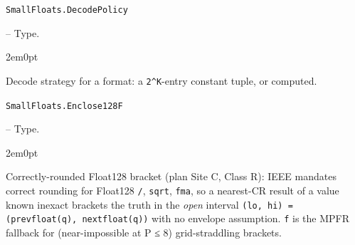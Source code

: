 \par\medskip\noindent\begin{minipage}{\linewidth}
\hypertarget{5477313120957585094}{\texttt{SmallFloats.DecodePolicy}}  -- {Type.}
\nopagebreak
\begin{adjustwidth}{2em}{0pt}

Decode strategy for a format: a \texttt{2{\textasciicircum}K}-entry constant tuple, or computed.



\end{adjustwidth}
\end{minipage}
\par\medskip

\par\medskip\noindent\begin{minipage}{\linewidth}
\hypertarget{1455587366773904952}{\texttt{SmallFloats.Enclose128F}}  -- {Type.}
\nopagebreak
\begin{adjustwidth}{2em}{0pt}

Correctly-rounded Float128 bracket (plan Site C, Class R): IEEE mandates correct rounding for Float128 \texttt{/}, \texttt{sqrt}, \texttt{fma}, so a nearest-CR result of a value known inexact brackets the truth in the \emph{open} interval \texttt{(\allowbreak{}lo, hi) = (\allowbreak{}prevfloat(\allowbreak{}q), nextfloat(\allowbreak{}q))} with no envelope assumption. \texttt{f} is the MPFR fallback for (near-impossible at P ≤ 8) grid-straddling brackets.



\end{adjustwidth}
\end{minipage}
\par\medskip


